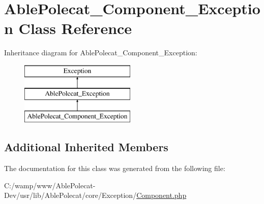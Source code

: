 \hypertarget{class_able_polecat___component___exception}{}\section{Able\+Polecat\+\_\+\+Component\+\_\+\+Exception Class Reference}
\label{class_able_polecat___component___exception}
Inheritance diagram for Able\+Polecat\+\_\+\+Component\+\_\+\+Exception\+:\begin{figure}[H]
\begin{center}
\leavevmode
\includegraphics[height=3.000000cm]{class_able_polecat___component___exception}
\end{center}
\end{figure}
\subsection*{Additional Inherited Members}


The documentation for this class was generated from the following file\+:\begin{DoxyCompactItemize}
\item 
C\+:/wamp/www/\+Able\+Polecat-\/\+Dev/usr/lib/\+Able\+Polecat/core/\+Exception/\hyperlink{_exception_2_component_8php}{Component.\+php}\end{DoxyCompactItemize}
